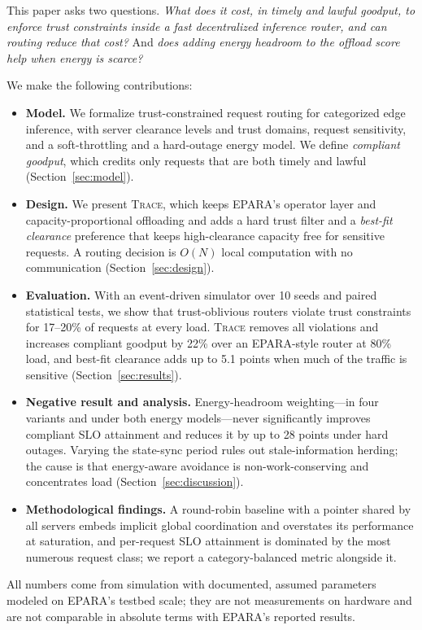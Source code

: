 \documentclass[journal]{IEEEtran}
\newcommand{\sys}{\textsc{Trace}}
\begin{document}
This paper asks two questions. \emph{What does it cost, in timely and lawful goodput, to enforce trust constraints inside a fast decentralized inference router, and can routing reduce that cost?} And \emph{does adding energy headroom to the offload score help when energy is scarce?}

We make the following contributions:
\begin{itemize}
\item \textbf{Model.} We formalize trust-constrained request routing for categorized edge inference, with server clearance levels and trust domains, request sensitivity, and a soft-throttling and a hard-outage energy model. We define \emph{compliant goodput}, which credits only requests that are both timely and lawful (Section~\ref{sec:model}).
\item \textbf{Design.} We present \sys{}, which keeps EPARA's operator layer and capacity-proportional offloading and adds a hard trust filter and a \emph{best-fit clearance} preference that keeps high-clearance capacity free for sensitive requests. A routing decision is $O(N)$ local computation with no communication (Section~\ref{sec:design}).
\item \textbf{Evaluation.} With an event-driven simulator over 10 seeds and paired statistical tests, we show that trust-oblivious routers violate trust constraints for 17--20\% of requests at every load. \sys{} removes all violations and increases compliant goodput by 22\% over an EPARA-style router at 80\% load, and best-fit clearance adds up to 5.1 points when much of the traffic is sensitive (Section~\ref{sec:results}).
\item \textbf{Negative result and analysis.} Energy-headroom weighting---in four variants and under both energy models---never significantly improves compliant SLO attainment and reduces it by up to 28 points under hard outages. Varying the state-sync period rules out stale-information herding; the cause is that energy-aware avoidance is non-work-conserving and concentrates load (Section~\ref{sec:discussion}).
\item \textbf{Methodological findings.} A round-robin baseline with a pointer shared by all servers embeds implicit global coordination and overstates its performance at saturation, and per-request SLO attainment is dominated by the most numerous request class; we report a category-balanced metric alongside it.
\end{itemize}

All numbers come from simulation with documented, assumed parameters modeled on EPARA's testbed scale; they are not measurements on hardware and are not comparable in absolute terms with EPARA's reported results.
\end{document}
